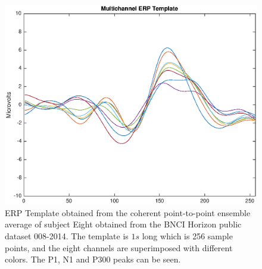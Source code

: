 \documentclass[brainsci,article,submit,moreauthors,pdftex,10pt,a4paper]{mdpi}
\begin{document}

\begin{figure}[H]
\centering
\includegraphics[width=12cm]{images/erptemplate1.eps}
\caption{ERP Template obtained from the coherent point-to-point ensemble average of subject Eight obtained from the BNCI Horizon public dataset 008-2014. The template is $1s$ long which is 256 sample points, and the eight channels are superimposed with different colors.  The P1, N1 and P300 peaks can be seen.}
\label{fig:erptemplate1}
\end{figure}
\end{document}
